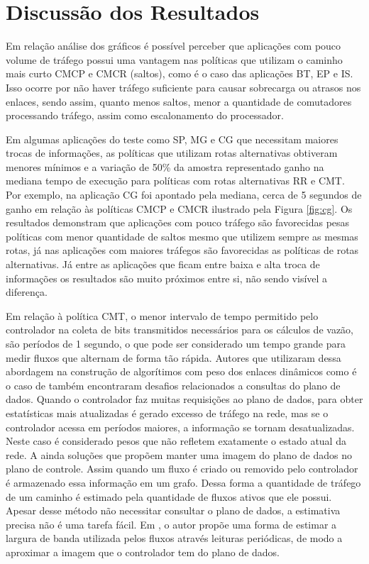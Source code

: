 \section{Discussão dos Resultados}
\label{sec:discussao_resultados}
 Em relação análise dos gráficos é possível perceber que aplicações com pouco volume de tráfego possui uma vantagem nas políticas que utilizam o caminho mais curto CMCP e CMCR (saltos), como é o caso das aplicações BT, EP e IS. Isso ocorre por não haver tráfego suficiente para causar sobrecarga ou atrasos nos enlaces, sendo assim, quanto menos saltos, menor a quantidade de comutadores processando tráfego, assim como escalonamento do processador. 

Em algumas aplicações do teste como  SP, MG e CG que necessitam maiores trocas de informações, as políticas que utilizam rotas alternativas obtiveram menores mínimos e a variação de 50\% da amostra representado ganho na mediana tempo de execução para políticas com rotas alternativas RR e CMT. Por exemplo, na aplicação CG  foi apontado pela mediana, cerca de 5 segundos de ganho em relação às políticas CMCP e CMCR ilustrado pela Figura \ref{fig:cg}. Os resultados demonstram que aplicações com pouco tráfego são favorecidas pesas políticas com menor quantidade de saltos mesmo que utilizem sempre as mesmas rotas, já nas aplicações com maiores tráfegos são favorecidas as políticas de rotas alternativas. Já entre as aplicações que ficam entre baixa e alta troca de informações os resultados são muito próximos entre si, não sendo visível a diferença.

Em relação à política CMT, o menor intervalo de tempo permitido pelo controlador na coleta de bits transmitidos necessários para os cálculos de vazão, são períodos de 1 segundo, o que pode ser considerado um tempo grande para medir fluxos que alternam de forma tão rápida. Autores que utilizaram dessa abordagem na construção de algorítimos com peso dos enlaces dinâmicos como é o caso de \cite{akin2019comparison} também encontraram desafios relacionados a consultas do plano de dados. Quando o controlador faz muitas requisições ao plano de dados, para obter estatísticas mais atualizadas é gerado excesso de tráfego na rede, mas se o controlador acessa em períodos maiores, a informação se tornam desatualizadas. Neste caso é considerado pesos que não refletem exatamente o estado atual da rede. A ainda soluções que propõem manter uma imagem do plano de dados no plano de controle. Assim quando um fluxo é criado ou removido pelo controlador é armazenado essa informação em um grafo. Dessa forma a quantidade de tráfego de um caminho é estimado pela quantidade de fluxos ativos que ele possui. Apesar desse método não necessitar consultar o plano de dados, a estimativa precisa não é uma tarefa fácil. Em \cite{singh2017estimation}, o autor propõe uma forma de estimar a largura de banda utilizada pelos fluxos através leituras periódicas, de modo a aproximar a imagem que o controlador tem do plano de dados.  

